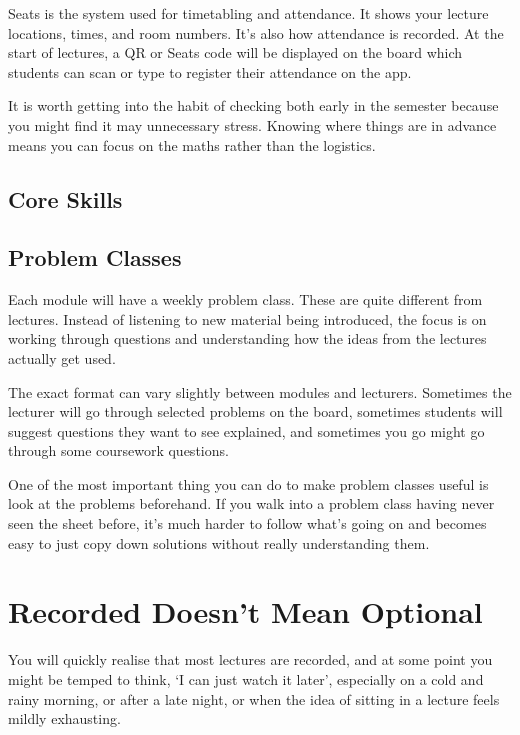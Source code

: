 Seats is the system used for timetabling and attendance. It shows your lecture locations, times, and room numbers. It's also how attendance is recorded. At the start of lectures, a QR or Seats code will be displayed on the board which students can scan or type to register their attendance on the app. 

It is worth getting into the habit of checking both early in the semester because you might find it may unnecessary stress. Knowing where things are in advance means you can focus on the maths rather than the logistics. 

\subsection{Core Skills}


\subsection{Problem Classes}

Each module will have a weekly problem class. These are quite different from lectures. Instead of listening to new material being introduced, the focus is on working through questions and understanding how the ideas from the lectures actually get used.

The exact format can vary slightly between modules and lecturers. Sometimes the lecturer will go through selected problems on the board, sometimes students will suggest questions they want to see explained, and sometimes you go might go through some coursework questions. 

One of the most important thing you can do to make problem classes useful is look at the problems beforehand. If you walk into a problem class having never seen the sheet before, it’s much harder to follow what’s going on and becomes easy to just copy down solutions without really understanding them.

\section{Recorded Doesn't Mean Optional}

You will quickly realise that most lectures are recorded, and at some point you might be temped to think, `I can just watch it later', especially on a cold and rainy morning, or after a late night, or when the idea of sitting in a lecture feels mildly exhausting. 

